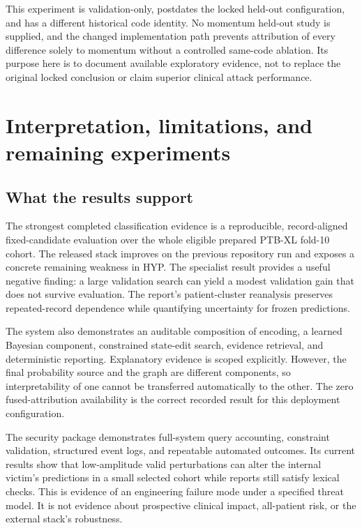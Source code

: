 This experiment is validation-only, postdates the locked held-out configuration, and has a different historical code identity. No momentum held-out study is supplied, and the changed implementation path prevents attribution of every difference solely to momentum without a controlled same-code ablation. Its purpose here is to document available exploratory evidence, not to replace the original locked conclusion or claim superior clinical attack performance.

\section{Interpretation, limitations, and remaining experiments}
\label{sec:discussion}
\subsection{What the results support}
The strongest completed classification evidence is a reproducible, record-aligned fixed-candidate evaluation over the whole eligible prepared PTB-XL fold-10 cohort. The released stack improves on the previous repository run and exposes a concrete remaining weakness in HYP. The specialist result provides a useful negative finding: a large validation search can yield a modest validation gain that does not survive evaluation. The report's patient-cluster reanalysis preserves repeated-record dependence while quantifying uncertainty for frozen predictions.

The system also demonstrates an auditable composition of encoding, a learned Bayesian component, constrained state-edit search, evidence retrieval, and deterministic reporting. Explanatory evidence is scoped explicitly. However, the final probability source and the graph are different components, so interpretability of one cannot be transferred automatically to the other. The zero fused-attribution availability is the correct recorded result for this deployment configuration.

The security package demonstrates full-system query accounting, constraint validation, structured event logs, and repeatable automated outcomes. Its current results show that low-amplitude valid perturbations can alter the internal victim's predictions in a small selected cohort while reports still satisfy lexical checks. This is evidence of an engineering failure mode under a specified threat model. It is not evidence about prospective clinical impact, all-patient risk, or the external stack's robustness.


